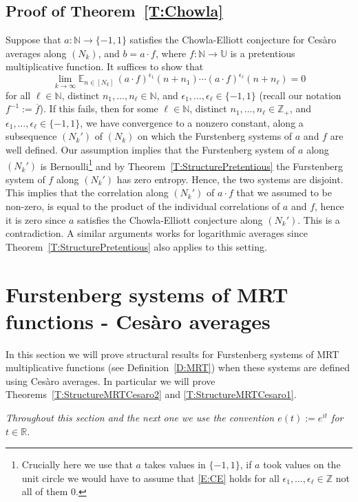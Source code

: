 \documentclass[11pt]{amsart}
\theoremstyle{definition}
\newcommand{\E}{{\mathbb E}}
\newcommand{\N}{{\mathbb N}}
\newcommand{\R}{{\mathbb R}}
\newcommand{\Z}{{\mathbb Z}}
\newcommand{\U}{{\mathbb U}}
\begin{document}
\subsection{Proof of Theorem~\ref{T:Chowla}}\label{SS:Chowla}
Suppose that $a\colon \N\to \{-1,1\}$  satisfies the Chowla-Elliott  conjecture for Ces\`aro averages along $(N_k)$,
and $b=a \cdot f$, where  $f\colon \N\to \U$ is a  pretentious multiplicative function.
It suffices to show that
$$
\lim_{k\to \infty} \E_{n\in[N_k]}\, (a\cdot f)^{\epsilon_1}(n+n_1)\cdots (a\cdot f)^{\epsilon_\ell}(n+n_\ell)=0
$$
for all $\ell\in \N$, distinct  $n_1,\ldots, n_\ell\in \N$, and $\epsilon_1,\ldots, \epsilon_\ell\in \{-1,1\}$ (recall our notation $f^{-1}:=\overline{f}$). If this fails, then for some  $\ell\in \N$, distinct $n_1,\ldots, n_\ell\in \Z_+$,
and $\epsilon_1,\ldots, \epsilon_\ell\in \{-1,1\}$, we have convergence to a nonzero constant, along a subsequence $(N_k')$ of $(N_k)$ on which the Furstenberg systems of $a$ and $f$ are well defined. Our  assumption implies that the Furstenberg system of $a$ along $(N_k')$ is Bernoulli\footnote{Crucially here we use that $a$ takes values in $\{-1,1\}$, if $a$ took values on the unit circle we would have to assume that \eqref{E:CE} holds for all  $\epsilon_1,\ldots, \epsilon_\ell\in \Z$ not all of them $0$.}   and by Theorem~\ref{T:StructurePretentious} the Furstenberg system of $f$  along $(N_k')$ has zero entropy. Hence, the two systems are disjoint. This implies that the correlation along $(N_k')$ of $a\cdot f$ that we assumed to be non-zero,   is equal to the product of the individual correlations of $a$ and $f$, hence it is  zero since $a$ satisfies the Chowla-Elliott conjecture along $(N_k')$. This is a contradiction. 	A similar arguments works for logarithmic averages since Theorem~\ref{T:StructurePretentious}  also applies to this setting.



 	 \section{Furstenberg systems of MRT functions - Ces\`aro averages}\label{S:MRTCesaro}
 In this section we will prove structural results for Furstenberg systems of MRT multiplicative functions (see Definition~\ref{D:MRT}) when these systems are defined using Ces\`aro averages. In particular we will prove Theorems~\ref{T:StructureMRTCesaro2} and \ref{T:StructureMRTCesaro1}.

\smallskip

{\em  Throughout this section and the next one we use the convention $e(t):=e^{it}$ for $t\in \R$.}
\end{document}
